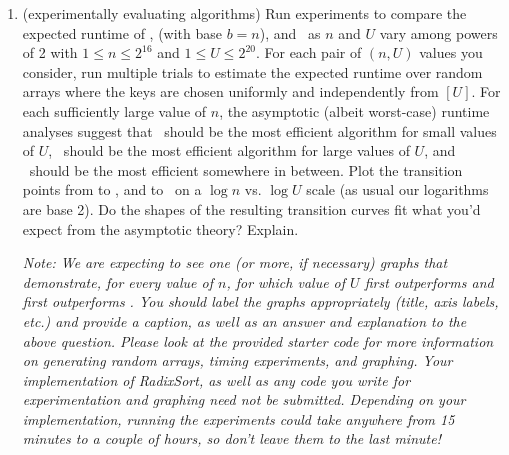 \documentclass[11pt]{article}
\begin{document}
\begin{enumerate}
\begin{enumerate}
            \item (experimentally evaluating algorithms) Run experiments to compare the expected runtime of \CountingSort, \RadixSort (with base $b=n$), and \MergeSort\ as $n$ and $U$ vary among powers of 2 with $1\leq n\leq 2^{16}$ and $1\leq U\leq 2^{20}$.  For each pair of $(n,U)$ values you consider, run multiple trials to estimate the expected runtime over random arrays where the keys are chosen uniformly and independently from $[U]$.  For each sufficiently large value of $n$, the asymptotic (albeit worst-case) runtime analyses suggest that \CountingSort\ should be the most efficient algorithm for small values of $U$, \MergeSort\ should be the most efficient algorithm for large values of $U$, and \RadixSort\ should be the most efficient somewhere in between.  Plot the transition points from \CountingSort to \RadixSort, and \RadixSort to \MergeSort\ on a $\log n$ vs. $\log U$ scale (as usual our logarithms are base 2).  Do the shapes of the resulting transition curves fit what you'd expect from the asymptotic theory?  Explain.
            
            \textit{Note: We are expecting to see one (or more, if necessary) graphs that demonstrate, for every value of $n$, for which value of $U$ \RadixSort first outperforms \CountingSort and \MergeSort first outperforms \RadixSort. You should label the graphs appropriately (title, axis labels, etc.) and provide a caption, as well as an answer and explanation to the above question. Please look at the provided starter code for more information on generating random arrays, timing experiments, and graphing. Your implementation of RadixSort, as well as any code you write for experimentation and graphing need not be submitted.  Depending on your implementation, running the experiments could take anywhere from 15 minutes to a couple of hours, so don't leave them to the last minute!}   
        \newline


\end{enumerate}
\end{enumerate}
\end{document}
